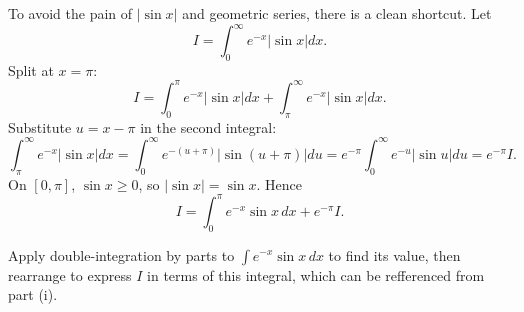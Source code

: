 \begin{remark}
To avoid the pain of $|{\sin x}|$ and geometric series, there is a clean shortcut. Let
\[
I = \int_0^\infty e^{-x} \left| \sin x \right| dx.
\]
Split at $x = \pi$:
\[
I = \int_0^\pi e^{-x} \left| \sin x \right| dx + \int_\pi^\infty e^{-x} \left| \sin x \right| dx.
\]
Substitute $u = x - \pi$ in the second integral:
\[
\int_\pi^\infty e^{-x} \left| \sin x \right| dx
= \int_0^\infty e^{-(u+\pi)} \left| \sin(u+\pi) \right| du
= e^{-\pi} \int_0^\infty e^{-u} \left| \sin u \right| du
= e^{-\pi} I.
\]
On $[0,\pi]$, $\sin x \ge 0$, so $\left| \sin x \right| = \sin x$. Hence
\[
I = \int_0^\pi e^{-x} \sin x \, dx + e^{-\pi} I.
\]

Apply double-integration by parts to $\int e^{-x} \sin x \, dx$ to find its value, then rearrange to express $I$ in terms of this integral, which can be refferenced from part (i).
\end{remark}
